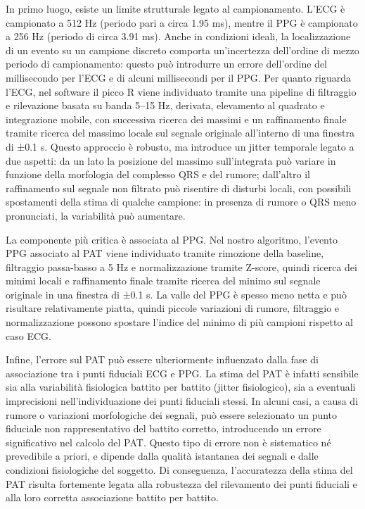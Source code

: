 \documentclass[11pt,a4paper]{article}
\begin{document}
In primo luogo, esiste un limite strutturale legato al campionamento. L’ECG è campionato a 512 Hz (periodo pari a circa 1.95 ms), mentre il PPG è campionato a 256 Hz (periodo di circa 3.91 ms). Anche in condizioni ideali, la localizzazione di un evento su un campione discreto comporta un’incertezza dell’ordine di mezzo periodo di campionamento: questo può introdurre un errore dell’ordine del millisecondo per l’ECG e di alcuni millisecondi per il PPG.
Per quanto riguarda l’ECG, nel software il picco R viene individuato tramite una pipeline di filtraggio e rilevazione basata su banda 5–15 Hz, derivata, elevamento al quadrato e integrazione mobile, con successiva ricerca dei massimi e un raffinamento finale tramite ricerca del massimo locale sul segnale originale all’interno di una finestra di ±0.1 s. Questo approccio è robusto, ma introduce un jitter temporale legato a due aspetti: da un lato la posizione del massimo sull’integrata può variare in funzione della morfologia del complesso QRS e del rumore; dall’altro il raffinamento sul segnale non filtrato può risentire di disturbi locali, con possibili spostamenti della stima di qualche campione: in presenza di rumore o QRS meno pronunciati, la variabilità può aumentare.


La componente più critica è associata al PPG. Nel nostro algoritmo, l’evento PPG associato al PAT viene individuato tramite rimozione della baseline, filtraggio passa-basso a 5 Hz e normalizzazione tramite Z-score, quindi ricerca dei minimi locali e raffinamento finale tramite ricerca del minimo sul segnale originale in una finestra di ±0.1 s. La valle del PPG è spesso meno netta e può risultare relativamente piatta, quindi piccole variazioni di rumore, filtraggio e normalizzazione possono spostare l’indice del minimo di più campioni rispetto al caso ECG. 


Infine, l’errore sul PAT può essere ulteriormente influenzato dalla fase di associazione tra i punti fiduciali ECG e PPG. La stima del PAT è infatti sensibile sia alla variabilità fisiologica battito per battito (jitter fisiologico), sia a eventuali imprecisioni nell’individuazione dei punti fiduciali stessi. In alcuni casi, a causa di rumore o variazioni morfologiche dei segnali, può essere selezionato un punto fiduciale non rappresentativo del battito corretto, introducendo un errore significativo nel calcolo del PAT. Questo tipo di errore non è sistematico né prevedibile a priori, e dipende dalla qualità istantanea dei segnali e dalle condizioni fisiologiche del soggetto. Di conseguenza, l’accuratezza della stima del PAT risulta fortemente legata alla robustezza del rilevamento dei punti fiduciali e alla loro corretta associazione battito per battito.
\end{document}
